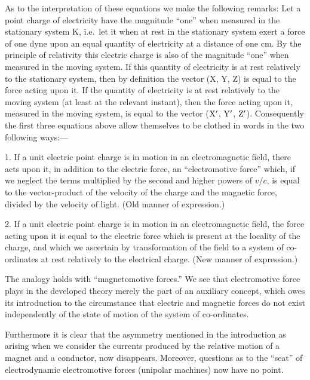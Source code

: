 \documentclass{article}
\newcommand{\pr}[1]{${\rm #1}'$}
\begin{document}
\noindent
As to the interpretation of these equations we make the following
remarks: Let a point charge of electricity have the magnitude ``one''
when measured in the stationary system K, i.e.\ let it when at rest
in the stationary system exert a force of one dyne upon an equal
quantity of electricity at a distance of one cm.  By the principle of
relativity this electric charge is also of the magnitude ``one'' when
measured in the moving system.  If this quantity of electricity is at
rest relatively to the stationary system, then by definition the
vector (X, Y, Z) is equal to the force acting upon it.  If the
quantity of electricity is at rest relatively to the moving system (at
least at the relevant instant), then the force acting upon it,
measured in the moving system, is equal to the vector (\pr{X}, \pr{Y}, \pr{Z}).
Consequently the first three equations above allow themselves to be
clothed in words in the two following ways:---

1.  If a unit electric point charge is in motion in an electromagnetic
field, there acts upon it, in addition to the electric force, an
``electromotive force'' which, if we neglect the terms multiplied by the
second and higher powers of $v/c$, is equal to the vector-product of the
velocity of the charge and the magnetic force, divided by the velocity
of light.  (Old manner of expression.)

2.  If a unit electric point charge is in motion in an electromagnetic
field, the force acting upon it is equal to the electric force which
is present at the locality of the charge, and which we ascertain by
transformation of the field to a system of co-ordinates at rest
relatively to the electrical charge.  (New manner of expression.)

The analogy holds with ``magnetomotive forces.'' We see that
electromotive force plays in the developed theory merely the part of
an auxiliary concept, which owes its introduction to the circumstance
that electric and magnetic forces do not exist independently of the
state of motion of the system of co-ordinates.

Furthermore it is clear that the asymmetry mentioned in the
introduction as arising when we consider the currents produced by the
relative motion of a magnet and a conductor, now disappears.
Moreover, questions as to the ``seat'' of electrodynamic electromotive
forces (unipolar machines) now have no point.

\end{document}
